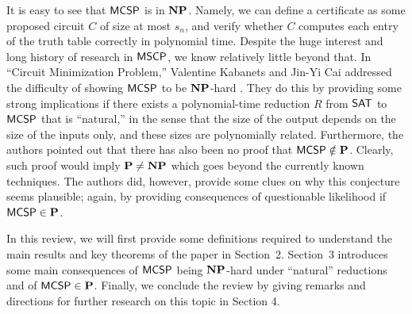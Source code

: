 \documentclass[11pt]{article}
\begin{document}
It is easy to see that $\mathsf{MCSP}$ is in $\mathbf{NP}$. Namely, we can define a certificate as some proposed circuit $C$ of size at most $s_n$, and verify whether $C$ computes each entry of the truth table correctly in polynomial time.
%
Despite the huge interest and long history of research in $\mathsf{MSCP}$,
we know relatively little beyond that.
%
In ``Circuit Minimization Problem,'' Valentine Kabanets and Jin-Yi Cai addressed the difficulty of showing $\mathsf{MCSP}$ to be $\mathbf{NP}$-hard \cite{10.1145/335305.335314}. They do this by providing some strong implications if there exists a polynomial-time reduction $R$ from $\mathsf{SAT}$ to $\mathsf{MCSP}$ that is ``natural,'' in the sense that the size of the output depends on the size of the inputs only, and these sizes are polynomially related. Furthermore, the authors pointed
out that there has also been no proof that $\mathsf{MCSP} \notin \mathbf{P}$. Clearly, such proof would imply $\mathbf{P} \neq \mathbf{NP}$ which goes beyond the currently known techniques. The authors did, however, provide some clues on why this conjecture seems plausible; again, by providing consequences of questionable likelihood if $\mathsf{MCSP} \in \mathbf{P}$.

In this review, we will first provide some definitions required to understand the main results and key theorems of the paper in Section~2. Section~3 introduces some main consequences of $\mathsf{MCSP}$ being $\mathbf{NP}$-hard under ``natural'' reductions and of $\mathsf{MCSP} \in \mathbf{P}$. Finally, we conclude the review by giving remarks and directions for further research on this topic in Section 4.


%



\end{document}
